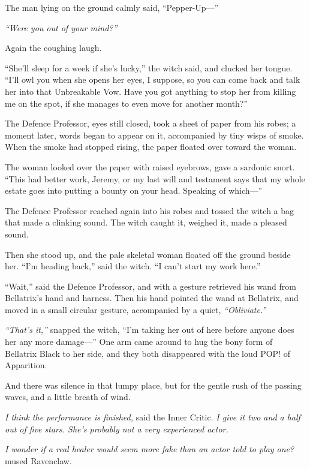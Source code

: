 The man lying on the ground calmly said, ``Pepper-Up---''

\emph{``Were you out of your mind?''}

Again the coughing laugh.

``She'll sleep for a week if she's lucky,'' the witch said, and clucked
her tongue. ``I'll owl you when she opens her eyes, I suppose, so you
can come back and talk her into that Unbreakable Vow. Have you got
anything to stop her from killing me on the spot, if she manages to even
move for another month?''

The Defence Professor, eyes still closed, took a sheet of paper from his
robes; a moment later, words began to appear on it, accompanied by tiny
wisps of smoke. When the smoke had stopped rising, the paper floated
over toward the woman.

The woman looked over the paper with raised eyebrows, gave a sardonic
snort. ``This had better work, Jeremy, or my last will and testament
says that my whole estate goes into putting a bounty on your head.
Speaking of which---''

The Defence Professor reached again into his robes and tossed the witch
a bag that made a clinking sound. The witch caught it, weighed it, made
a pleased sound.

Then she stood up, and the pale skeletal woman floated off the ground
beside her. ``I'm heading back,'' said the witch. ``I can't start my
work here.''

``Wait,'' said the Defence Professor, and with a gesture retrieved his
wand from Bellatrix's hand and harness. Then his hand pointed the wand
at Bellatrix, and moved in a small circular gesture, accompanied by a
quiet, \emph{``Obliviate.''}

\emph{``That's it,''} snapped the witch, ``I'm taking her out of here
before anyone does her any more damage---'' One arm came around to hug
the bony form of Bellatrix Black to her side, and they both disappeared
with the loud POP! of Apparition.

And there was silence in that lumpy place, but for the gentle rush of
the passing waves, and a little breath of wind.

\emph{I think the performance is finished,} said the Inner Critic.
\emph{I give it two and a half out of five stars. She's probably not a
very experienced actor.}

\emph{I wonder if a real healer would seem more fake than an actor told
to play one?} mused Ravenclaw.

